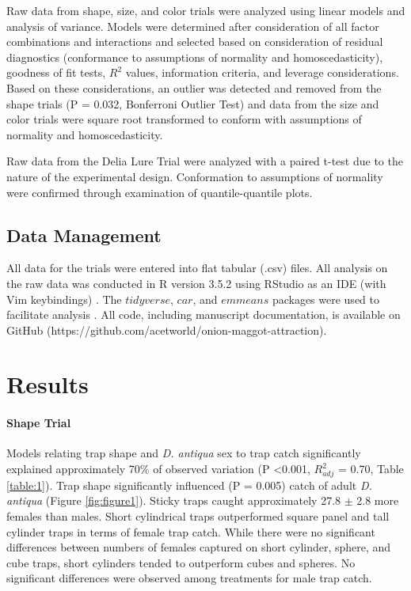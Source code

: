 \documentclass[alpha-refs]{wiley-article}
\begin{document}
Raw data from shape, size, and color trials were analyzed using linear models and analysis of variance.  Models were determined after consideration of all factor combinations and interactions and selected based on consideration of residual diagnostics (conformance to assumptions of normality and homoscedasticity), goodness of fit tests, $R^2$ values, information criteria, and leverage considerations. Based on these considerations, an outlier was detected and removed from the shape trials (P = 0.032, Bonferroni Outlier Test) and data from the size and color trials were square root transformed to conform with assumptions of normality and homoscedasticity.    

Raw data from the Delia Lure Trial were analyzed with a paired t-test due to the nature of the experimental design.  Conformation to assumptions of normality were confirmed through examination of quantile-quantile plots.

\subsection{Data Management}

All data for the trials were entered into flat tabular (.csv) files.  All analysis on the raw data was conducted in R version 3.5.2 using RStudio as an IDE (with Vim keybindings) \citep{rcore2018,rstudio}.  The $tidyverse$, $car$, and $emmeans$ packages were used to facilitate analysis \citep{tidy, car, emmeans}.  All code, including manuscript documentation, is available on GitHub (https://github.com/acetworld/onion-maggot-attraction).

\section{Results}


\paragraph{Shape Trial} Models relating trap shape and \textit{D. antiqua} sex to trap catch significantly explained approximately 70\% of observed variation (P \textless 0.001, $R^2_{adj}$ = 0.70, Table \ref{table:1}).  Trap shape significantly influenced (P = 0.005) catch of adult \textit{D. antiqua} (Figure \ref{fig:figure1}).  Sticky traps caught approximately 27.8 $\pm$ 2.8 more females than males.  Short cylindrical traps outperformed square panel and tall cylinder traps in terms of female trap catch.  While there were no significant differences between numbers of females captured on short cylinder, sphere, and cube traps, short cylinders tended to outperform cubes and spheres.  No significant differences were observed among treatments for male trap catch.  
\end{document}
